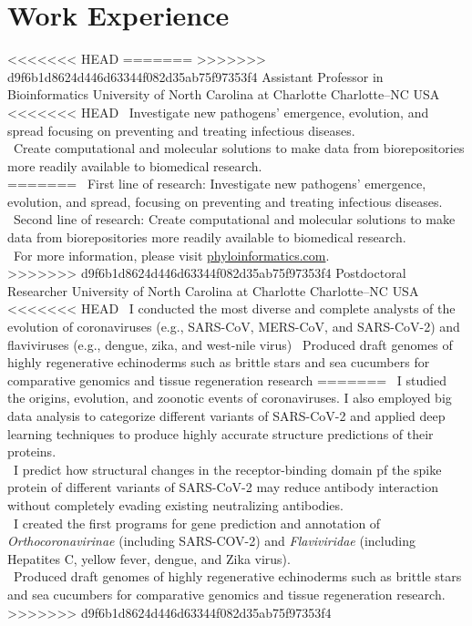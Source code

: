 \documentclass[11pt, letterpaper, sans]{moderncv}
\begin{document}
\vspace{-0.5em}

\section{Work Experience}
<<<<<<< HEAD
=======
>>>>>>> d9f6b1d8624d446d63344f082d35ab75f97353f4
{Assistant Professor in Bioinformatics}
{University of North Carolina at Charlotte}
{Charlotte--NC}
{USA}
{
<<<<<<< HEAD
\textbullet~Investigate new pathogens' emergence, evolution, and spread focusing on preventing and treating infectious diseases.\\
\textbullet~Create computational and molecular solutions to make data from biorepositories more readily available to biomedical research.\\
=======
\textbullet~First line of research: Investigate new pathogens’ emergence, evolution, and spread, focusing on preventing and treating infectious diseases.\\
\textbullet~Second line of research: Create computational and molecular solutions to make data from biorepositories more readily available to biomedical research.\\
\textbullet~For more information, please visit \href{https://phyloinformatics.com/}{phyloinformatics.com}.\\
>>>>>>> d9f6b1d8624d446d63344f082d35ab75f97353f4
}
%
{Postdoctoral Researcher}
{University of North Carolina at Charlotte}
{Charlotte--NC}
{USA}
{
<<<<<<< HEAD
\textbullet~I conducted the most diverse and complete analysts of the evolution of coronaviruses (e.g., SARS-CoV, MERS-CoV, and SARS-CoV-2) and flaviviruses (e.g., dengue, zika, and west-nile virus)
\textbullet~Produced draft genomes of highly regenerative echinoderms such as brittle stars and sea cucumbers for
comparative genomics and tissue regeneration research
=======
\textbullet~I studied the origins, evolution, and zoonotic events of coronaviruses. I also employed big data analysis to categorize different variants of SARS-CoV-2 and applied deep learning techniques to produce highly accurate structure predictions of their proteins.\\
\textbullet~I predict how structural changes in the receptor-binding domain pf the spike protein of different variants of SARS-CoV-2 may reduce antibody interaction without completely evading existing neutralizing antibodies.\\ %
\textbullet~I created the first programs for gene prediction and annotation of \textit{Orthocoronavirinae} (including SARS-COV-2) and \textit{Flaviviridae} (including Hepatites C, yellow fever, dengue, and Zika virus).\\ %
\textbullet~Produced draft genomes of highly regenerative echinoderms such as brittle stars and sea cucumbers for comparative genomics and tissue regeneration research.
>>>>>>> d9f6b1d8624d446d63344f082d35ab75f97353f4
}
\end{document}
